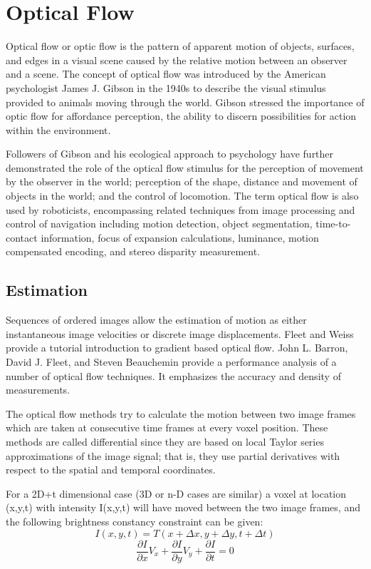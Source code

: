 \section{Optical Flow}
Optical flow or optic flow is the pattern of apparent motion of objects, surfaces,
and edges in a visual scene caused by the relative motion between an observer and a
scene. The concept of optical flow was introduced by the American psychologist James
J. Gibson in the 1940s to describe the visual stimulus provided to animals moving
through the world. Gibson stressed the importance of optic flow for affordance
perception, the ability to discern possibilities for action within the environment.\par
Followers of Gibson and his ecological approach to psychology have further demonstrated the role of the optical flow stimulus for the perception of movement by
the observer in the world; perception of the shape, distance and movement of objects in
the world; and the control of locomotion.
The term optical flow is also used by roboticists, encompassing related
techniques from image processing and control of navigation including motion detection,
object segmentation, time-to-contact information, focus of expansion calculations,
luminance, motion compensated encoding, and stereo disparity measurement.

\subsection{Estimation}
Sequences of ordered images allow the estimation of motion as either
instantaneous image velocities or discrete image displacements. Fleet and Weiss
provide a tutorial introduction to gradient based optical flow. John L. Barron, David J.
Fleet, and Steven Beauchemin provide a performance analysis of a number of optical
flow techniques. It emphasizes the accuracy and density of measurements.\par
The optical flow methods try to calculate the motion between two image frames
which are taken at consecutive time frames at every voxel position. These methods are
called differential since they are based on local Taylor series approximations of the
image signal; that is, they use partial derivatives with respect to the spatial and temporal
coordinates. \par
For a 2D+t dimensional case (3D or n-D cases are similar) a voxel at location (x,y,t)
with intensity I(x,y,t) will have moved between the two image frames, and the following
brightness constancy constraint can be given:
\begin{equation}
I(x,y,t) = T(x + \Delta x, y + \Delta y, t + \Delta t)
\end{equation}
\begin{equation}
\frac{\partial I}{\partial x}V_x + \frac{\partial I}{\partial y}V_y + \frac{\partial I}{\partial t} = 0
\end{equation}

